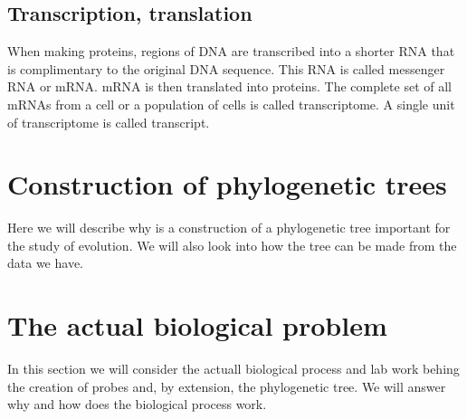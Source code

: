 \subsection{Transcription, translation}%
When making proteins, regions of DNA are transcribed into a shorter RNA that is complimentary to the original DNA sequence. 
This RNA is called messenger RNA or mRNA. mRNA is then translated into proteins. The complete set of all mRNAs from a 
cell or a population of cells is called transcriptome. A single unit of transcriptome is called transcript. 


\section{Construction of phylogenetic trees}

Here we will describe why is a construction of a phylogenetic tree important for the study of evolution. We will also look 
into how the tree can be made from the data we have. 

\section{The actual biological problem}

In this section we will consider the actuall biological process and lab work behing the creation of probes and, by extension, 
the phylogenetic tree. We will answer why and how does the biological process work. 

